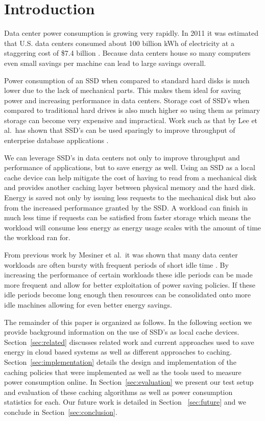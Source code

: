 \section{Introduction}

Data center power consumption is growing very rapidly. In 2011 it was estimated
that U.S. data centers consumed about 100 billion kWh of electricity at a
staggering cost of \$7.4 billion \cite{data-center-power}. Because data centers
house so many computers even small savings per machine can lead to large
savings overall.

Power consumption of an SSD when compared to standard hard disks is much lower
due to the lack of mechanical parts. This makes them ideal for saving power and
increasing performance in data centers. Storage cost of SSD's when compared to
traditional hard drives is also much higher so using them as primary storage can
become very expensive and impractical. Work such as that by Lee et al.\ has
shown that SSD's can be used sparingly to improve throughput of enterprise
database applications \cite{enterprise-ssd}.

We can leverage SSD's in data centers not only to improve throughput and
performance of applications, but to save energy as well. Using an SSD as a local
cache device can help mitigate the cost of having to read from a mechanical disk
and provides another caching layer between physical memory and the hard
disk. Energy is saved not only by issuing less requests to the mechanical disk
but also from the increased performance granted by the SSD. A workload can
finish in much less time if requests can be satisfied from faster storage which
means the workload will consume less energy as energy usage scales with the
amount of time the workload ran for.

From previous work by Mesiner et al.\ it was shown that many data center
workloads are often bursty with frequent periods of short idle time
\cite{powernap}. By increasing the performance of certain workloads these idle
periods can be made more frequent and allow for better exploitation of power
saving policies. If these idle periods become long enough then resources can be
consolidated onto more idle machines allowing for even better energy savings.

The remainder of this paper is organized as follows. In the following section we
provide background information on the use of SSD's as local cache
devices. Section~\ref{sec:related} discusses related work and current approaches
used to save energy in cloud based systems as well as different approaches to
caching. Section~\ref{sec:implementation} details the design and implementation
of the caching policies that were implemented as well as the tools used to
measure power consumption online. In Section~\ref{sec:evaluation} we present our
test setup and evaluation of these caching algorithms as well as power
consumption statistics for each. Our future work is detailed in Section
~\ref{sec:future} and we conclude in Section~\ref{sec:conclusion}.
